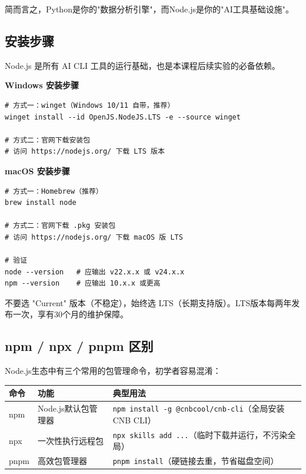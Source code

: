 简而言之，Python是你的"数据分析引擎"，而Node.js是你的"AI工具基础设施"。

\subsection{安装步骤}

Node.js 是所有 AI CLI 工具的运行基础，也是本课程后续实验的必备依赖。

\textbf{Windows 安装步骤}

\begin{lstlisting}[style=shell]
# 方式一：winget（Windows 10/11 自带，推荐）
winget install --id OpenJS.NodeJS.LTS -e --source winget

# 方式二：官网下载安装包
# 访问 https://nodejs.org/ 下载 LTS 版本
\end{lstlisting}

\textbf{macOS 安装步骤}

\begin{lstlisting}[style=shell]
# 方式一：Homebrew（推荐）
brew install node

# 方式二：官网下载 .pkg 安装包
# 访问 https://nodejs.org/ 下载 macOS 版 LTS

# 验证
node --version   # 应输出 v22.x.x 或 v24.x.x
npm --version    # 应输出 10.x.x 或更高
\end{lstlisting}

\begin{notebox}[版本选择提示]
不要选 "Current" 版本（不稳定），始终选 LTS（长期支持版）。LTS版本每两年发布一次，享有30个月的维护保障。
\end{notebox}

\subsection{npm / npx / pnpm 区别}

Node.js生态中有三个常用的包管理命令，初学者容易混淆：

\begin{table}[H]
\centering
\begin{tabular}{lp{4cm}p{5cm}}
\toprule
\textbf{命令} & \textbf{功能} & \textbf{典型用法} \\
\midrule
npm & Node.js默认包管理器 & \texttt{npm install -g @cnbcool/cnb-cli}（全局安装CNB CLI） \\
npx & 一次性执行远程包 & \texttt{npx skills add ...}（临时下载并运行，不污染全局） \\
pnpm & 高效包管理器 & \texttt{pnpm install}（硬链接去重，节省磁盘空间） \\
\bottomrule
\end{tabular}
\end{table}

